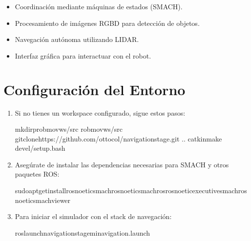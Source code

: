 \documentclass[a4paper,10pt,spanish]{sphinxmanual}
\begin{document}
\sphinxAtStartPar
{}
\begin{itemize}
\item {} 
\sphinxAtStartPar
Coordinación mediante máquinas de estados (SMACH).

\item {} 
\sphinxAtStartPar
Procesamiento de imágenes RGBD para detección de objetos.

\item {} 
\sphinxAtStartPar
Navegación autónoma utilizando LIDAR.

\item {} 
\sphinxAtStartPar
Interfaz gráfica para interactuar con el robot.

\end{itemize}

\sphinxstepscope


\section{Configuración del Entorno}
\label{\detokenize{configuracion:configuracion-del-entorno}}\label{\detokenize{configuracion::doc}}\begin{enumerate}
%
\item {} 
\sphinxAtStartPar
{}
Si no tienes un workspace configurado, sigue estos pasos:

\begin{sphinxVerbatim}[commandchars=\\\{\}]
mkdir\PYGZhy{}prob\PYGZus{}mov\PYGZus{}ws/src
rob\PYGZus{}mov\PYGZus{}ws/src
gitclonehttps://github.com/ottocol/navigation\PYGZus{}stage.git
..
catkin\PYGZus{}make
devel/setup.bash
\end{sphinxVerbatim}

\item {} 
\sphinxAtStartPar
{}
Asegúrate de instalar las dependencias necesarias para SMACH y otros paquetes ROS:

\begin{sphinxVerbatim}[commandchars=\\\{\}]
sudoapt\PYGZhy{}getinstallros\PYGZhy{}noetic\PYGZhy{}smachros\PYGZhy{}noetic\PYGZhy{}smach\PYGZhy{}rosros\PYGZhy{}noetic\PYGZhy{}executive\PYGZhy{}smachros\PYGZhy{}noetic\PYGZhy{}smach\PYGZhy{}viewer
\end{sphinxVerbatim}

\item {} 
\sphinxAtStartPar
{}
Para iniciar el simulador con el stack de navegación:

\begin{sphinxVerbatim}[commandchars=\\\{\}]
roslaunchnavigation\PYGZus{}stagemi\PYGZus{}navigation.launch
\end{sphinxVerbatim}

\end{enumerate}
\end{document}
